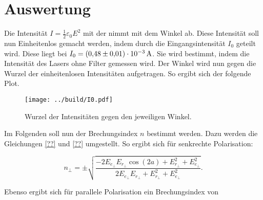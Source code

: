 


\section{Auswertung}
\label{sec:Auswertung}


Die Intensität $I=\frac1 2 \varepsilon_0 E^2$ mit der nimmt mit dem Winkel ab. Diese Intensität soll nun Einheitenlos gemacht werden, indem durch die 
Eingangsintensität $I_0$ geteilt wird. Diese liegt bei $I_0=\qty{0.48\pm0.01e-3}{\ampere}$. Sie wird bestimmt, indem die Intensität des Lasers ohne 
Filter gemessen wird. 
Der Winkel wird nun gegen die Wurzel der einheitenlosen Intensitäten aufgetragen. So ergibt sich der folgende Plot.

\begin{figure}
    \texttt{[image: ../build/I0.pdf]}
    \caption{Wurzel der Intensitäten gegen den jeweiligen Winkel.}
\end{figure}



Im Folgenden soll nun der Brechungsindex $n$ bestimmt werden. Dazu werden die Gleichungen \eqref{??} und \eqref{??} umgestellt. 
So ergibt sich für senkrechte Polarisation:

\begin{equation}
    n_\bot = \pm\sqrt{\frac{-2 E_{e_\bot} E_{r_\bot} \cos{(2a)} + E_{r_\bot}^2 + E_{e_\bot}^2 }{ 2 E_{e_\bot} E_{r_\bot} + E_{r_\bot}^2 + E_{e_\bot}^2  }}.
\end{equation}


\noindent Ebenso ergibt sich für parallele Polarisation ein Brechungsindex von 






